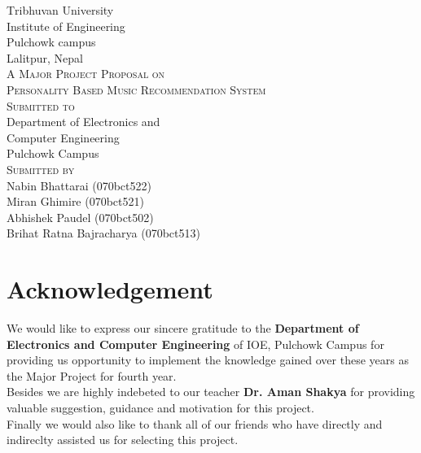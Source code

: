 \documentclass{article}
\begin{document}
\begin{titlepage}
  \begin{center}
    {\Huge\textsc Tribhuvan University}\\
    [0.03in]
    {\LARGE\textsc Institute of Engineering}\\
    [0.05in]
    {\Large\textsc Pulchowk campus}\\
    [0.02in]
    {\large\textsc Lalitpur, Nepal}\\
    [2in]

    {\LARGE \textsc{A Major Project Proposal on}}\\
    [0.5cm]
    {\Large \textsc{Personality Based Music Recommendation System}}\\
    [1.8in]
    
    {\LARGE\textsc{Submitted to}}\\
    [0.05in]
    {\large Department of Electronics and }\\
    {\large Computer Engineering}\\
    {\large Pulchowk Campus}\\
    [1in]

    {\LARGE \textsc{\large Submitted by}}\\
    [0.05in]
    {\large Nabin Bhattarai (070bct522)}\\
    [0.05in]
    {\large Miran Ghimire (070bct521)}\\
    [0.05in]
    {\large Abhishek Paudel (070bct502)}\\
    [0.05in]
    {\large Brihat Ratna Bajracharya (070bct513)}\\
    [0.05in]
  \end{center}
\end{titlepage}

\setcounter{page}{2}

\section*{Acknowledgement}
	We would like to express our sincere gratitude to the \textbf{Department of Electronics and Computer Engineering }of IOE, Pulchowk Campus for providing us opportunity to implement the knowledge gained over these years as the Major Project for fourth year.\\ 
	Besides we are highly indebeted to our teacher \textbf{Dr. Aman Shakya} for providing valuable suggestion, guidance and motivation for this project.\\
Finally we would also like to thank all of our friends who have directly and indireclty assisted us for selecting this project.
\cleardoublepage
\end{document}
